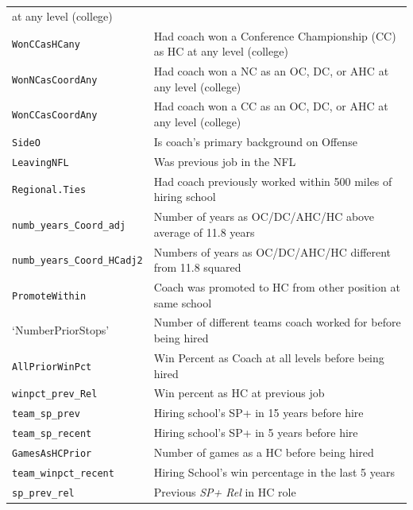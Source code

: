 \documentclass[
  12pt]{article}
\begin{document}
\begin{longtable}[]{@{}
  >{\raggedright\arraybackslash}p{}
  >{\raggedright\arraybackslash}p{}@{}}
at any level (college) \\
\texttt{WonCCasHCany} & Had coach won a Conference Championship (CC) as
HC at any level (college) \\
\texttt{WonNCasCoordAny} & Had coach won a NC as an OC, DC, or AHC at
any level (college) \\
\texttt{WonCCasCoordAny} & Had coach won a CC as an OC, DC, or AHC at
any level (college) \\
\texttt{SideO} & Is coach's primary background on Offense \\
\texttt{LeavingNFL} & Was previous job in the NFL \\
\texttt{Regional.Ties} & Had coach previously worked within 500 miles of
hiring school \\
\texttt{numb\_years\_Coord\_adj} & Number of years as OC/DC/AHC/HC above
average of 11.8 years \\
\texttt{numb\_years\_Coord\_HCadj2} & Numbers of years as OC/DC/AHC/HC
different from 11.8 squared \\
\texttt{PromoteWithin} & Coach was promoted to HC from other position at
same school \\
`NumberPriorStops' & Number of different teams coach worked for before
being hired \\
\texttt{AllPriorWinPct} & Win Percent as Coach at all levels before
being hired \\
\texttt{winpct\_prev\_Rel} & Win percent as HC at previous job \\
\texttt{team\_sp\_prev} & Hiring school's SP+ in 15 years before hire \\
\texttt{team\_sp\_recent} & Hiring school's SP+ in 5 years before
hire \\
\texttt{GamesAsHCPrior} & Number of games as a HC before being hired \\
\texttt{team\_winpct\_recent} & Hiring School's win percentage in the
last 5 years \\
\texttt{sp\_prev\_rel} & Previous \emph{SP+ Rel} in HC role \\
\end{longtable}
\end{document}
